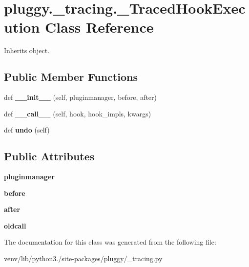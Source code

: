 \hypertarget{classpluggy_1_1__tracing_1_1___traced_hook_execution}{}\section{pluggy.\+\_\+tracing.\+\_\+\+Traced\+Hook\+Execution Class Reference}
\label{classpluggy_1_1__tracing_1_1___traced_hook_execution}


Inherits object.

\subsection*{Public Member Functions}
\begin{DoxyCompactItemize}
\item 
\mbox{\label{classpluggy_1_1__tracing_1_1___traced_hook_execution_a099d188d313c9ef78d7df761fa90258e}} 
def {\bfseries \+\_\+\+\_\+init\+\_\+\+\_\+} (self, pluginmanager, before, after)
\item 
\mbox{\label{classpluggy_1_1__tracing_1_1___traced_hook_execution_a8d8ba938ee1776608164d7344d0d642a}} 
def {\bfseries \+\_\+\+\_\+call\+\_\+\+\_\+} (self, hook, hook\+\_\+impls, kwargs)
\item 
\mbox{\label{classpluggy_1_1__tracing_1_1___traced_hook_execution_a82a39d5dd2eef83cf230718ce0a1177f}} 
def {\bfseries undo} (self)
\end{DoxyCompactItemize}
\subsection*{Public Attributes}
\begin{DoxyCompactItemize}
\item 
\mbox{\label{classpluggy_1_1__tracing_1_1___traced_hook_execution_a9c0de056a8e63d7e2c338507b98acfaa}} 
{\bfseries pluginmanager}
\item 
\mbox{\label{classpluggy_1_1__tracing_1_1___traced_hook_execution_a8156e1e65b9ae67cfb805838bf9fb1b5}} 
{\bfseries before}
\item 
\mbox{\label{classpluggy_1_1__tracing_1_1___traced_hook_execution_a2d84bb500634afa75be47a44f518899a}} 
{\bfseries after}
\item 
\mbox{\label{classpluggy_1_1__tracing_1_1___traced_hook_execution_a1f06ee1364d2567e8746e5ac4a3db1f5}} 
{\bfseries oldcall}
\end{DoxyCompactItemize}


The documentation for this class was generated from the following file\+:\begin{DoxyCompactItemize}
\item 
venv/lib/python3./site-\/packages/pluggy/\+\_\+tracing.\+py\end{DoxyCompactItemize}
